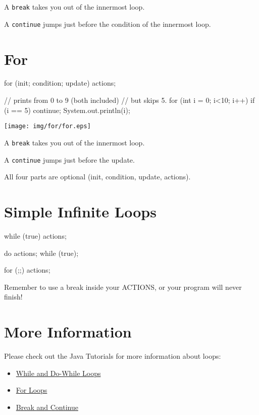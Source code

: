 \documentclass[a4paper, 12pt]{article}
\begin{document}
A \verb+break+ takes you out of the innermost loop.

A \verb+continue+ jumps just before the condition of the innermost loop.

\section{For}

\begin{multicols}{2}
\begin{blackboard}
  for (init; condition; update) {
      actions;
  }

// prints from 0 to 9 (both included)
// but skips 5.
for (int i = 0; i<10; i++) {
    if (i == 5) {
      continue;
    }
    System.out.println(i);
}
\end{blackboard}

\columnbreak

\begin{center}
  \texttt{[image: img/for/for.eps]}
\end{center}

\end{multicols}

A \verb+break+ takes you out of the innermost loop.

A \verb+continue+ jumps just before the update.

All four parts are optional (init, condition, update, actions).

\section{Simple Infinite Loops}

\begin{blackboard}
  while (true) {
    actions;
  }

  do {
    actions;
  } while (true);

  for (;;) {
    actions;
  }

  Remember to use a break inside your ACTIONS, or your program will
  never finish!
\end{blackboard}

\section{More Information}

Please check out the Java Tutorials for more information about loops:

\begin{itemize}

  \item \href{http://docs.oracle.com/javase/tutorial/java/nutsandbolts/while.html}{While and Do-While Loops}

  \item \href{http://docs.oracle.com/javase/tutorial/java/nutsandbolts/for.html}{For Loops}

  \item \href{http://docs.oracle.com/javase/tutorial/java/nutsandbolts/branch.html}{Break and Continue}

\end{itemize}
\end{document}
